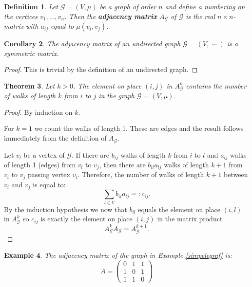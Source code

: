 \documentclass[a4paper,11pt]{report}
\newtheorem{theorem}{Theorem}[section]
\newtheorem{example}[theorem]{Example}
\newtheorem{definition}[theorem]{Definition}
\newtheorem{corollary}[theorem]{Corollary}
\newcommand{\graf}{\mathscr{G}}
\begin{document}
 
 \begin{definition}
 Let $\graf=(V, \mu)$ be a graph of order $n$ and define a numbering on the 
 vertices $v_1,\ldots, v_n$. Then the \textbf{adjacency matrix} $A_\graf$ of $\graf$ is the real
 $n\times n$-matrix with $a_{ij}$ equal to $\mu(v_i, v_j)$.
 \end{definition}
 
 \begin{corollary}
   The adjacency matrix of an undirected graph $\graf=(V, \sim)$ is a symmetric 
   matrix.
 \end{corollary}
 
 \begin{proof}
   This is trivial by the definition of an undirected graph.
 \end{proof}
\begin{theorem}\label{numberwalks}
  Let $k > 0$. The element on place $(i,j)$ in $A^k_\graf$ contains the number 
  of walks of length $k$ from $i$ to $j$ in the graph $\graf = (V, \mu)$.
\end{theorem}
 \begin{proof}
   By induction on $k$. 
   
   For $k = 1$ we count the walks of length $1$. These are edges and the 
   result follows immediately from the definition of $A_\graf$.
   
  Let $v_l$ be a vertex of $\graf$. If there are $b_{ij}$ walks of length $k$ 
  from $i$ to $l$ and $a_{lj}$ walks of length 1 (edges) from $v_l$ to $v_j$, 
  then there are $b_{il}a_{lj}$ walks of length $k+1$ from $v_i$ to $v_j$ passing vertex 
  $v_l$. Therefore, the number of walks of length $k+1$ between $v_i$ and $v_j$ 
  is equal to:
  $$\sum_{l\in V} b_{il}a_{lj} =: c_{ij}.$$
By the induction hypothesis we now that $b_{il}$ equals  the element on place $(i,l)$ 
in $A^k_\graf$ so $c_{ij}$ is exactly the element on place $(i,j)$ in the matrix 
product
$$A^k_\graf A_\graf = A^{k+1}_\graf.$$
 \end{proof}
 \begin{example}
The adjacency matrix of the graph in Example \ref{simpelegraf} is:
$$A = \begin{pmatrix}
0 & 1 & 1\\
1 & 0 & 1\\
1 & 1 & 0
\end{pmatrix}$$


\end{example}
\end{document}
